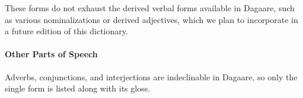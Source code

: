 \begin{refsection}
These forms do not exhaust the derived verbal forms available in Dagaare, such as various nominalizations or derived adjectives, which we plan to incorporate in a future edition of this dictionary.

\paragraph*{Other Parts of Speech}

Adverbs, conjunctions, and interjections are indeclinable in Dagaare, so only the single form is listed along with its gloss.



\printbibliography[heading=subbibliography]
\end{refsection}